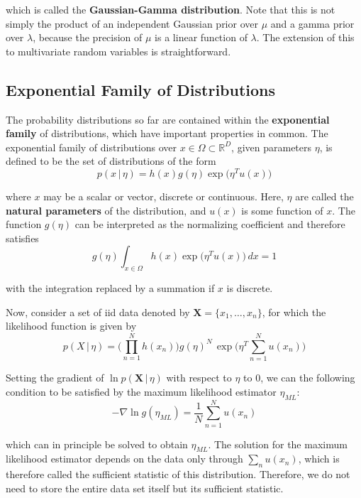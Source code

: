   which is called the \textbf{Gaussian-Gamma distribution}. Note that this is not simply the product of an independent Gaussian prior over $\mu$ and a gamma prior over $\lambda$, because the precision of $\mu$ is a linear function of $\lambda$. The extension of this to multivariate random variables is straightforward.

\subsection{Exponential Family of Distributions}

  The probability distributions so far are contained within the \textbf{exponential family} of distributions, which have important properties in common. The exponential family of distributions over $x \in \Omega \subset \mathbb{R}^D$, given parameters $\eta$, is defined to be the set of distributions of the form
  \begin{equation}
    p(x\,|\,\eta) = h(x) g(\eta) \exp\big(\eta^T u(x)\big)
  \end{equation}

  where $x$ may be a scalar or vector, discrete or continuous. Here, $\eta$ are called the \textbf{natural parameters} of the distribution, and $u(x)$ is some function of $x$. The function $g(\eta)$ can be interpreted as the normalizing coefficient and therefore satisfies
  \begin{equation}
    g(\eta) \int_{x \in \Omega} h(x) \exp\big(\eta^T u(x)\big) \, dx = 1
  \end{equation}

  with the integration replaced by a summation if $x$ is discrete.

  Now, consider a set of iid data denoted by $\mathbf{X} = \{x_1, \ldots, x_n\}$, for which the likelihood function is given by
  \begin{equation}
    p(X\,|\,\eta) = \bigg( \prod_{n=1}^N h(x_n) \bigg) g(\eta)^N\, \exp \bigg( \eta^T \sum_{n=1}^N u(x_n) \bigg)
  \end{equation}

  Setting the gradient of $\ln p(\mathbf{X}\,|\, \eta)$ with respect to $\eta$ to $0$, we can the following condition to be satisfied by the maximum likelihood estimator $\eta_{ML}$:
  \begin{equation}
    -\nabla \ln g(\eta_{ML}) = \frac{1}{N} \sum_{n=1}^N u(x_n)
  \end{equation}

  which can in principle be solved to obtain $\eta_{ML}$. The solution for the maximum likelihood estimator depends on the data only through $\sum_n u(x_n)$, which is therefore called the sufficient statistic of this distribution. Therefore, we do not need to store the entire data set itself but its sufficient statistic.


